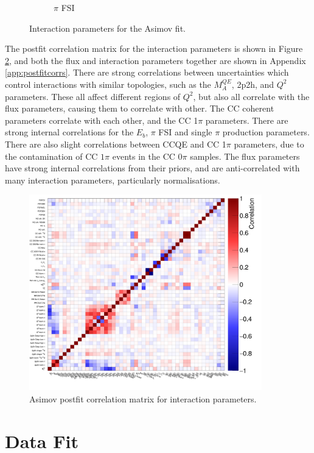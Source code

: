 \begin{figure}[!htbp]
\begin{subfigure}{0.49\textwidth}
  \caption{$\pi$ FSI}
\end{subfigure}
\caption{Interaction parameters for the Asimov fit.}
\label{fig:asmvxsec}
\end{figure}

The postfit correlation matrix for the interaction parameters is shown in Figure \ref{fig:asmvpostfitcovXsec}, and both the flux and interaction parameters together are shown in Appendix \ref{app:postfitcorrs}. There are strong correlations between uncertainties which control interactions with similar topologies, such as the $M^{QE}_A$, 2p2h, and $Q^2$ parameters. These all affect different regions of $Q^2$, but also all correlate with the flux parameters, causing them to correlate with other. The CC coherent parameters correlate with each other, and the CC 1$\pi$ parameters. There are strong internal correlations for the $E_b$, $\pi$ FSI and single $\pi$ production parameters. There are also slight correlations between CCQE and CC 1$\pi$ parameters, due to the contamination of CC $1\pi$ events in the CC 0$\pi$ samples. The flux parameters have strong internal correlations from their priors, and are anti-correlated with many interaction parameters, particularly normalisations.

\begin{figure}[!htbp]
\centering
\includegraphics*[width=0.9\textwidth,clip]{figs/Mach3AsmvCorrXsec}
\caption{Asimov postfit correlation matrix for interaction parameters.}\label{fig:asmvpostfitcovXsec}
\end{figure}

\section{Data Fit}\label{sec:datafit}

